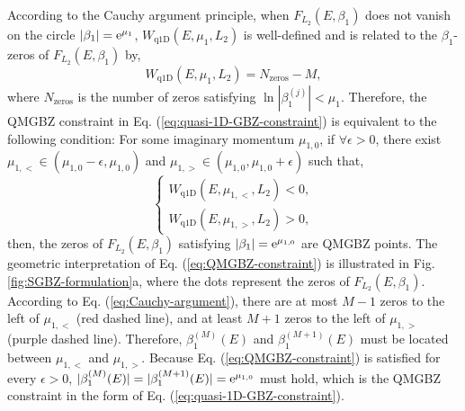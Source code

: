 \documentclass[pdflatex,sn-nature, iicol]{sn-jnl}%
\theoremstyle{thmstyleone}%
\theoremstyle{thmstyletwo}%
\theoremstyle{thmstylethree}%
\begin{document}
According to the Cauchy argument principle, when $F_{L_{2}}(E,\beta_{1})$
does not vanish on the circle $|\beta_{1}|=\mathrm{e}^{\mu_{1}}$, $W_{\text{q1D}}(E,\mu_{1},L_{2})$
is well-defined and is related to the $\beta_{1}$-zeros of $F_{L_{2}}(E,\beta_{1})$
by, 
\begin{equation}
W_{\text{q1D}}\left(E,\mu_{1},L_{2}\right)=N_{\text{zeros}}-M,\label{eq:Cauchy-argument}
\end{equation}
where $N_{\text{zeros}}$ is the number of zeros satisfying $\ln|\beta_{1}^{(j)}|<\mu_{1}$.
Therefore, the QMGBZ constraint in Eq. (\ref{eq:quasi-1D-GBZ-constraint})
is equivalent to the following condition: For some imaginary momentum
$\mu_{1,0}$, if $\forall\epsilon>0$, there exist $\mu_{1,<}\in(\mu_{1,0}-\epsilon,\mu_{1,0})$
and $\mu_{1,>}\in(\mu_{1,0},\mu_{1,0}+\epsilon)$ such that, 
\begin{equation}
\begin{cases}
W_{\text{q1D}}\left(E,\mu_{1,<},L_{2}\right)<0,\\
W_{\text{q1D}}\left(E,\mu_{1,>},L_{2}\right)>0,
\end{cases}\label{eq:QMGBZ-constraint}
\end{equation}
then, the zeros of $F_{L_{2}}(E,\beta_{1})$ satisfying $|\beta_{1}|=\mathrm{e}^{\mu_{1,0}}$
are QMGBZ points. The geometric interpretation of Eq. (\ref{eq:QMGBZ-constraint})
is illustrated in Fig. \ref{fig:SGBZ-formulation}a, where the dots
represent the zeros of $F_{L_{2}}(E,\beta_{1})$. According to Eq.
(\ref{eq:Cauchy-argument}), there are at most $M-1$ zeros to the
left of $\mu_{1,<}$ (red dashed line), and at least $M+1$ zeros
to the left of $\mu_{1,>}$ (purple dashed line). Therefore, $\beta_{1}^{(M)}(E)$
and $\beta_{1}^{(M+1)}(E)$ must be located between $\mu_{1,<}$ and
$\mu_{1,>}$. Because Eq. (\ref{eq:QMGBZ-constraint}) is satisfied
for every $\epsilon>0$, $|\beta_{1}^{(M)}(E)|=|\beta_{1}^{(M+1)}(E)|=\mathrm{e}^{\mu_{1,0}}$
must hold, which is the QMGBZ constraint in the form of Eq. (\ref{eq:quasi-1D-GBZ-constraint}).
\end{document}
